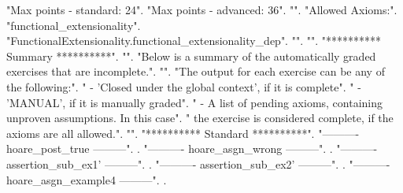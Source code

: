 \documentclass[12pt]{report}
\begin{document}
\begin{coqdoccode}
\coqdocemptyline
\coqdocnoindent
{} "Max points - standard: 24".\coqdoceol
\coqdocnoindent
{} "Max points - advanced: 36".\coqdoceol
\coqdocnoindent
{} "".\coqdoceol
\coqdocnoindent
{} "Allowed Axioms:".\coqdoceol
\coqdocnoindent
{} "functional\_extensionality".\coqdoceol
\coqdocnoindent
{} "FunctionalExtensionality.functional\_extensionality\_dep".\coqdoceol
\coqdocnoindent
{} "".\coqdoceol
\coqdocnoindent
{} "".\coqdoceol
\coqdocnoindent
{} "********** Summary **********".\coqdoceol
\coqdocnoindent
{} "".\coqdoceol
\coqdocnoindent
{} "Below is a summary of the automatically graded exercises that are incomplete.".\coqdoceol
\coqdocnoindent
{} "".\coqdoceol
\coqdocnoindent
{} "The output for each exercise can be any of the following:".\coqdoceol
\coqdocnoindent
{} "  - 'Closed under the global context', if it is complete".\coqdoceol
\coqdocnoindent
{} "  - 'MANUAL', if it is manually graded".\coqdoceol
\coqdocnoindent
{} "  - A list of pending axioms, containing unproven assumptions. In this case".\coqdoceol
\coqdocnoindent
{} "    the exercise is considered complete, if the axioms are all allowed.".\coqdoceol
\coqdocnoindent
{} "".\coqdoceol
\coqdocnoindent
{} "********** Standard **********".\coqdoceol
\coqdocnoindent
{} "---------- hoare\_post\_true ---------".\coqdoceol
\coqdocnoindent
{}  .\coqdoceol
\coqdocnoindent
{} "---------- hoare\_asgn\_wrong ---------".\coqdoceol
\coqdocnoindent
{}  .\coqdoceol
\coqdocnoindent
{} "---------- assertion\_sub\_ex1' ---------".\coqdoceol
\coqdocnoindent
{}  .\coqdoceol
\coqdocnoindent
{} "---------- assertion\_sub\_ex2' ---------".\coqdoceol
\coqdocnoindent
{}  .\coqdoceol
\coqdocnoindent
{} "---------- hoare\_asgn\_example4 ---------".\coqdoceol
\coqdocnoindent
{}  .\coqdoceol

\end{coqdoccode}
\end{document}
